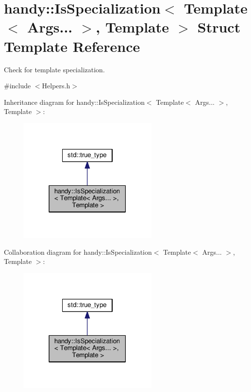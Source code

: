 \hypertarget{structhandy_1_1IsSpecialization_3_01Template_3_01Args_8_8_8_01_4_00_01Template_01_4}{}\section{handy\+:\+:Is\+Specialization$<$ Template$<$ Args... $>$, Template $>$ Struct Template Reference}
\label{structhandy_1_1IsSpecialization_3_01Template_3_01Args_8_8_8_01_4_00_01Template_01_4}


Check for template specialization.  




{\ttfamily \#include $<$Helpers.\+h$>$}



Inheritance diagram for handy\+:\+:Is\+Specialization$<$ Template$<$ Args... $>$, Template $>$\+:\nopagebreak
\begin{figure}[H]
\begin{center}
\leavevmode
\includegraphics[width=198pt]{structhandy_1_1IsSpecialization_3_01Template_3_01Args_8_8_8_01_4_00_01Template_01_4__inherit__graph}
\end{center}
\end{figure}


Collaboration diagram for handy\+:\+:Is\+Specialization$<$ Template$<$ Args... $>$, Template $>$\+:\nopagebreak
\begin{figure}[H]
\begin{center}
\leavevmode
\includegraphics[width=198pt]{structhandy_1_1IsSpecialization_3_01Template_3_01Args_8_8_8_01_4_00_01Template_01_4__coll__graph}
\end{center}
\end{figure}


